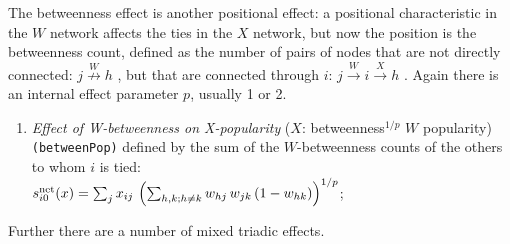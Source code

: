 \documentclass[a4paper,fleqn,11pt]{article}
\newcommand{\+}{\, + \,}
\newcommand{\vit}{\theenumi}
\newcounter{savenumi}
\begin{document}
\smallskip
The betweenness effect is another positional effect:
a positional characteristic in the $W$ network affects the
ties in the $X$ network, but now the position is the betweenness count,
defined as the number of pairs of nodes that are not directly connected:
 $j \stackrel{W}{\nrightarrow} h$ ,
but that are connected through $i$:
 $j \stackrel{W}{\rightarrow} i  \stackrel{X}{\rightarrow} h$ .
 Again there is an internal effect parameter $p$, usually
1 or 2.
\begin{enumerate}
\setcounter{enumi}{\value{savenumi}}
 \item {\em Effect of W-betweenness on X-popularity } ($X$: betweenness$^{1/p}$ $W$ popularity)  \texttt{(betweenPop)}
 defined by   the sum of  the $W$-betweenness counts of the others to whom $i$ is tied:\\
 $s^{\rm net}_{i\vit}(x) =  \sum_j x_{ij}\, \left(\sum_{h,k; h \neq k}w_{hj}\,w_{jk}\,(1-w_{hk})\right)^{1/p}  $;\\
\setcounter{savenumi}{\value{enumi}}
\end{enumerate}
\smallskip
Further there are a number of mixed triadic effects.
\end{document}
